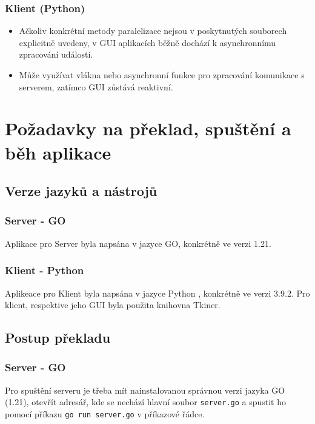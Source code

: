 \documentclass{article}
\begin{document}
\subsubsection{Klient (Python)}
\begin{itemize}
  \item Ačkoliv konkrétní metody paralelizace nejsou v poskytnutých souborech explicitně uvedeny, v GUI aplikacích běžně dochází k asynchronnímu zpracování událostí. 
  \item Může využívat vlákna nebo asynchronní funkce pro zpracování komunikace s serverem, zatímco GUI zůstává reaktivní.
\end{itemize}

\section{Požadavky na překlad, spuštění a běh aplikace}
\subsection{Verze jazyků a nástrojů}

\subsubsection{Server - GO}

Aplikace pro Server byla napsána v jazyce GO, konkrétně ve verzi 1.21.

\subsubsection{Klient - Python}

Aplikeace pro Klient byla napsána v jazyce Python , konkrétně ve verzi 3.9.2. Pro klient, respektive jeho GUI byla použita knihovna Tkiner.

\subsection{Postup překladu}

\subsubsection{Server - GO}

Pro spuštění serveru je třeba mít nainstalovanou správnou verzi jazyka GO (1.21), otevřít adresář, kde se nechází hlavní soubor \texttt{server.go} a spustit ho pomocí příkazu \texttt{go run server.go} v příkazové řádce.
\end{document}
